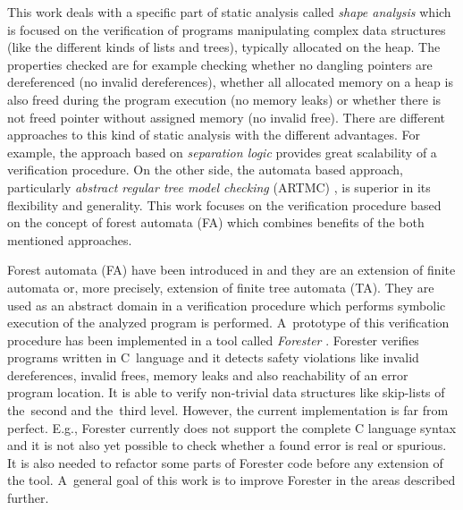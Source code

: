 \documentclass[fleqn,11pt]{ExcelAtFIT} %
\begin{document}
This work deals with a specific part of static analysis called \emph{shape analysis} which is focused on the verification of programs manipulating
complex data structures (like the different kinds of lists and trees), typically allocated on the heap.
The properties checked are for example checking whether no dangling
pointers are dereferenced (no invalid dereferences), whether all allocated memory on a heap is also freed
during the program execution (no memory leaks) or whether there is not freed pointer without assigned memory (no invalid free).
There are different approaches to this kind of static analysis with the different advantages.
For example, the approach based on \emph{separation logic} \cite{seplog,seplog07} provides great scalability of a verification procedure.
On the other side, the automata based approach, particularly \emph{abstract regular tree model checking} (ARTMC) \cite{artmc}, is
superior in its flexibility and generality.
This work focuses on the verification procedure based on the concept of forest automata (FA) which
combines benefits of the both mentioned approaches.

Forest automata (FA) have been introduced in \cite{forester11} and
they are an extension of finite automata or, more precisely, extension of finite tree automata (TA).
They are used as an abstract domain in a verification procedure which performs symbolic execution of the analyzed program is performed.
A~prototype of this verification procedure has been implemented in a tool called \emph{Forester} \cite{www:forester}.
Forester verifies programs written in C~language and it detects safety violations like invalid dereferences, invalid frees,
memory leaks and also reachability of an error program location.
It is able to verify non-trivial data structures like skip-lists of the~second and the~third level.
However, the current implementation is far from perfect.
E.g., Forester currently does not support the complete C language syntax and %
it is not also yet possible to check whether a found error is real or spurious.
It is also needed to refactor some parts of Forester code before any extension of the tool.
A~general goal of this work is to improve Forester in the areas described further.
\end{document}
